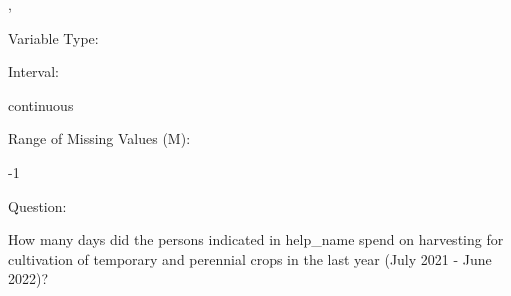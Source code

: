 \documentclass[
]{article}
\begin{document}
,

\begin{minipage}[t]{0.3\linewidth}

\colorbox{mypink1}{}

\end{minipage}%
\begin{minipage}[t]{0.7\linewidth}

\colorbox{mypink1}{\makebox[\textwidth]{\strut\bfseries\color{black}  
 }}

\end{minipage}

\begin{minipage}[t]{0.3\linewidth}

Variable Type:

\end{minipage}%
\begin{minipage}[t]{0.7\linewidth}

\end{minipage}

\begin{minipage}[t]{0.3\linewidth}

Interval:

\end{minipage}%
\begin{minipage}[t]{0.7\linewidth}

continuous

\end{minipage}

\begin{minipage}[t]{0.3\linewidth}

Range of Missing Values (M):

\end{minipage}%
\begin{minipage}[t]{0.7\linewidth}

-1

\end{minipage}

\begin{minipage}[t]{0.3\linewidth}

Question:

\end{minipage}%
\begin{minipage}[t]{0.7\linewidth}

How many days did the persons indicated in help\_name spend on
harvesting for cultivation of temporary and perennial crops in the last
year (July 2021 - June 2022)?

\end{minipage}
\end{document}

